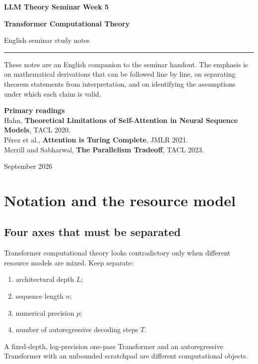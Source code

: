 \documentclass[11pt,a4paper,oneside,openany]{memoir}
\theoremstyle{definition}
\begin{document}
\begin{titlingpage}
\thispagestyle{empty}
\vspace*{1.2cm}
{\small\bfseries LLM Theory Seminar \hfill Week 5\par}
\vspace{1.4cm}
{\HUGE\bfseries Transformer Computational Theory\par}
\vspace{0.55cm}
{\large English seminar study notes\par}
\vspace{0.9cm}
\rule{\textwidth}{0.7pt}
\vspace{1.1cm}
\begin{minipage}{0.86\textwidth}
\small
These notes are an English companion to the seminar handout.  The emphasis is on
mathematical derivations that can be followed line by line, on separating theorem
statements from interpretation, and on identifying the assumptions under which each
claim is valid.
\end{minipage}
\vfill
{\small\textbf{Primary readings}\\[0.25em]
Hahn, \textbf{Theoretical Limitations of Self-Attention in Neural Sequence Models}, TACL 2020.\\P\'erez et al., \textbf{Attention is Turing Complete}, JMLR 2021.\\Merrill and Sabharwal, \textbf{The Parallelism Tradeoff}, TACL 2023.
\par}
\vspace{0.8cm}
{\small September 2026\par}
\end{titlingpage}
\tableofcontents*
\clearpage

\chapter{Notation and the resource model}
\section{Four axes that must be separated}
Transformer computational theory looks contradictory only when different resource models are mixed.  Keep separate:
\begin{enumerate}
\item architectural depth $L$;
\item sequence length $n$;
\item numerical precision $p$;
\item number of autoregressive decoding steps $T$.
\end{enumerate}
A fixed-depth, log-precision one-pass Transformer and an autoregressive Transformer with an unbounded scratchpad are different computational objects.
\end{document}

